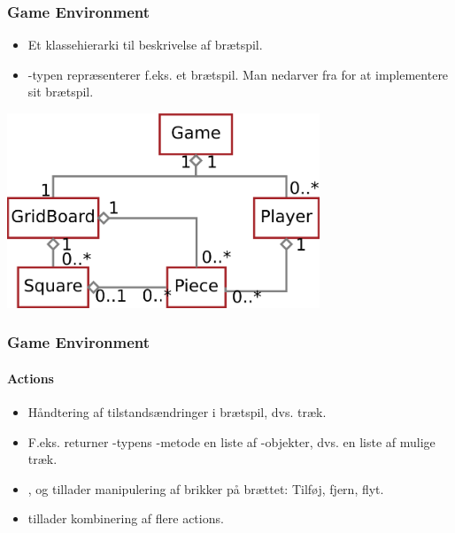\begin{frame}
\frametitle{Game Environment}
\begin{itemize}
\item Et klassehierarki til beskrivelse af brætspil.
\item {}-typen repræsenterer f.eks. et brætspil. Man nedarver fra  for at implementere sit brætspil.
\end{itemize}
\begin{center}
\includegraphics[width=0.7\textwidth]{niels/classes.png}
\end{center}
\end{frame}

\begin{frame}
\frametitle{Game Environment}
\framesubtitle{Actions}
\begin{itemize}[<+->]
\item Håndtering af tilstandsændringer i brætspil, dvs. træk.
\item F.eks. returner -typens -metode en liste af -objekter, dvs. en liste af mulige træk.
\item {},  og  tillader manipulering af brikker på brættet: Tilføj, fjern, flyt.
\item {} tillader kombinering af flere actions.
\end{itemize}
\end{frame}
